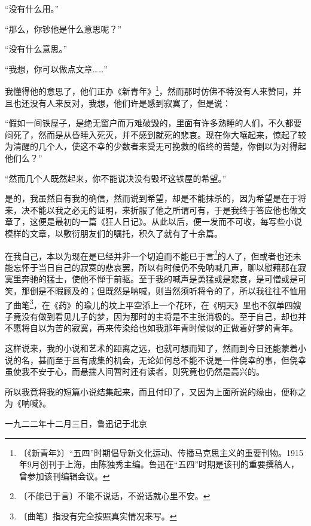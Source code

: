 \documentclass[12pt,UTF-8,openany]{ctexbook}
\begin{document}
\begin{normalsize}
    “没有什么用。”
    
    “那么，你钞他是什么意思呢？”
    
    “没有什么意思。”
    
    “我想，你可以做点文章……”
    
    我懂得他的意思了，他们正办《新青年》\footnote{〔《新青年》〕“五四”时期倡导新文化运动、传播马克思主义的重要刊物。1915年9月创刊于上海，由陈独秀主编。鲁迅在“五四”时期是该刊的重要撰稿人，曾参加该刊编辑会议。}，然而那时仿佛不特没有人来赞同，并且也还没有人来反对，我想，他们许是感到寂寞了，但是说：
    
    “假如一间铁屋子，是绝无窗户而万难破毁的，里面有许多熟睡的人们，不久都要闷死了，然而是从昏睡入死灭，并不感到就死的悲哀。现在你大嚷起来，惊起了较为清醒的几个人，使这不幸的少数者来受无可挽救的临终的苦楚，你倒以为对得起他们么？”
    
    “然而几个人既然起来，你不能说决没有毁坏这铁屋的希望。”
    
    是的，我虽然自有我的确信，然而说到希望，却是不能抹杀的，因为希望是在于将来，决不能以我之必无的证明，来折服了他之所谓可有，于是我终于答应他也做文章了，这便是最初的一篇《狂人日记》。从此以后，便一发而不可收，每写些小说模样的文章，以敷衍朋友们的嘱托，积久了就有了十余篇。
    
    在我自己，本以为现在是已经并非一个切迫而不能已于言\footnote{〔不能已于言〕不能不说话，不说话就心里不安。}的人了，但或者也还未能忘怀于当日自己的寂寞的悲哀罢，所以有时候仍不免呐喊几声，聊以慰藉那在寂寞里奔驰的猛士，使他不惮于前驱。至于我的喊声是勇猛或是悲哀，是可憎或是可笑，那倒是不暇顾及的；但既然是呐喊，则当然须听将令的了，所以我往往不恤用了曲笔\footnote{〔曲笔〕指没有完全按照真实情况来写。}，在《药》的瑜儿的坟上平空添上一个花环，在《明天》里也不叙单四嫂子竟没有做到看见儿子的梦，因为那时的主将是不主张消极的。至于自己，却也并不愿将自以为苦的寂寞，再来传染给也如我那年青时候似的正做着好梦的青年。
    
    这样说来，我的小说和艺术的距离之远，也就可想而知了，然而到今日还能蒙着小说的名，甚而至于且有成集的机会，无论如何总不能不说是一件侥幸的事，但侥幸虽使我不安于心，而悬揣人间暂时还有读者，则究竟也仍然是高兴的。
    
    所以我竟将我的短篇小说结集起来，而且付印了，又因为上面所说的缘由，便称之为《呐喊》。
    
    
    
    \hfill 一九二二年十二月三日，鲁迅记于北京
    
\end{normalsize}
\end{document}
